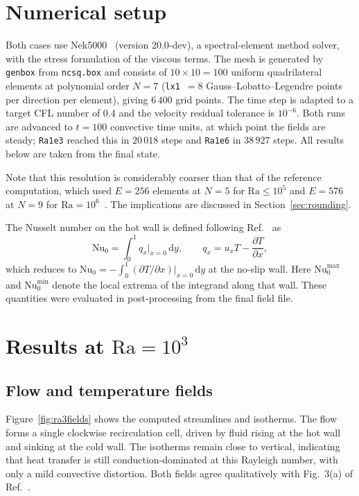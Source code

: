 \documentclass[11pt,a4paper]{article}
\begin{document}
\section{Numerical setup}
Both cases use Nek5000~\cite{fischer2008} (version 20.0-dev), a spectral-element
method solver,
with the stress formulation of the viscous terms. The mesh is generated by
\texttt{genbox} from \texttt{ncsq.box} and consists of $10\times10=100$ uniform
quadrilateral elements at polynomial order $N=7$ (\texttt{lx1}~$=8$
Gauss--Lobatto--Legendre points per direction per element), giving $6\,400$ grid
points. The time step is adapted to a target CFL number of $0.4$ and the
velocity residual tolerance is $10^{-6}$. Both runs are advanced to $t=100$
convective time units, at which point the fields are steady; \texttt{Ra1e3}
reached this in $20\,018$ steps and \texttt{Ra1e6} in $38\,927$ steps. All
results below are taken from the final state.

Note that this resolution is considerably coarser than that of the reference
computation, which used $E=256$ elements at $N=5$ for $\mathrm{Ra}\le10^{5}$ and
$E=576$ at $N=9$ for $\mathrm{Ra}=10^{6}$~\cite{patel2014}. The implications are
discussed in Section~\ref{sec:rounding}.

The Nusselt number on the hot wall is defined following Ref.~\cite{patel2014} as
\begin{equation}
\mathrm{Nu}_0 = \int_0^1 q_x\big|_{x=0}\,\mathrm{d}y,
\qquad
q_x = u_x T - \frac{\partial T}{\partial x},
\label{eq:nu}
\end{equation}
which reduces to $\mathrm{Nu}_0 = -\int_0^1 (\partial T/\partial x)|_{x=0}\,
\mathrm{d}y$ at the no-slip wall. Here $\mathrm{Nu}_0^{\max}$ and
$\mathrm{Nu}_0^{\min}$ denote the local extrema of the integrand along that
wall. These quantities were evaluated in post-processing from the final field
file.

\section{Results at \texorpdfstring{$\mathrm{Ra}=10^{3}$}{Ra=1e3}}

\subsection{Flow and temperature fields}
Figure~\ref{fig:ra3fields} shows the computed streamlines and isotherms. The
flow forms a single clockwise recirculation cell, driven by fluid rising at the
hot wall and sinking at the cold wall. The isotherms remain close to vertical,
indicating that heat transfer is still conduction-dominated at this Rayleigh
number, with only a mild convective distortion. Both fields agree qualitatively
with Fig.~3(a) of Ref.~\cite{patel2014}.
\end{document}

